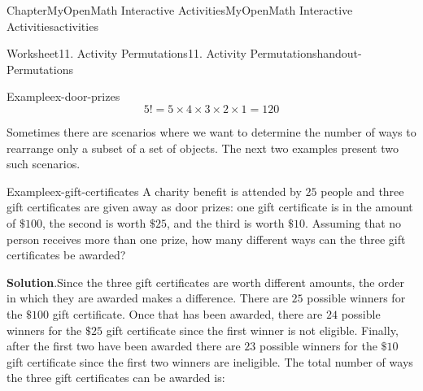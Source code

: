 \documentclass[oneside,10pt,]{book}
\newcommand{\blocktitlefont}{\relax}
\newcommand{\ptxlistdisc}{\raisebox{0.3ex}{\textbullet}}
\newlength{\fillinmaxwidth}
\newlength{\fillincontract}
\newlength{\charmaxwidth}\setlength{\charmaxwidth}{0.5em}
\newlength{\charminwidth}\setlength{\charminwidth}{0.1em}
\newlength{\fillinheight}
\newcommand{\fillintext}[1]{%
\setlength{\fillinmaxwidth}{#1\charmaxwidth}%
\setlength{\fillincontract}{#1\charminwidth}%
\setlength{\fillinheight}{\baselineskip}\addtolength{\fillinheight}{1.2pt}%
\strut\nobreak\leaders\vbox{\hrule width 0.3pt height 0.3pt \vskip -1.2pt}\hskip 1\fillinmaxwidth minus \fillincontract\nobreak\strut%
}
\begin{document}
\begin{chapterptx}{Chapter}{MyOpenMath Interactive Activities}{}{MyOpenMath Interactive Activities}{}{}{activities}
\begin{worksheet-section}{Worksheet}{11. Activity Permutations}{}{11. Activity Permutations}{}{}{handout-Permutations}
\begin{example}{Example}{}{ex-door-prizes}
\begin{equation*}
5! = 5 \times 4 \times 3 \times 2 \times 1 = 120
\end{equation*}
%
\end{example}
\clearpage
{}%
\clearpage
Sometimes there are scenarios where we want to determine the number of ways to rearrange only a subset of a set of objects. The next two examples present two such scenarios.%
\begin{example}{Example}{}{ex-gift-certificates}%
A charity benefit is attended by \(25\) people and three gift certificates are given away as door prizes: one gift certificate is in the amount of \(\$100\), the second is worth \(\$25\), and the third is worth \(\$10\). Assuming that no person receives more than one prize, how many different ways can the three gift certificates be awarded?%
\par\smallskip%
\noindent\textbf{\blocktitlefont Solution}.\hypertarget{ex-gift-certificates-2}{}\quad{}Since the three gift certificates are worth different amounts, the order in which they are awarded makes a difference. There are \(25\) possible winners for the \(\$100\) gift certificate. Once that has been awarded, there are \(24\) possible winners for the \(\$25\) gift certificate since the first winner is not eligible. Finally, after the first two have been awarded there are \(23\) possible winners for the \(\$10\) gift certificate since the first two winners are ineligible. The total number of ways the three gift certificates can be awarded is:%

\end{example}
\end{worksheet-section}
\end{chapterptx}
\end{document}
